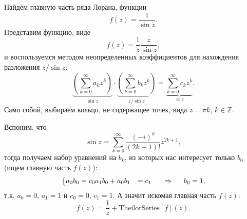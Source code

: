 
Найдём главную часть ряда Лорана, функции
\begin{equation*}
    f(z) = \frac{1}{\sin z}.
\end{equation*}
Представим функцию, виде
\begin{equation*}
    f(z) = \frac{1}{z} \frac{z}{\sin z},
\end{equation*}
и воспользуемся методом неопределенных коэффициентов для нахождения разложения ${z}/{\sin z}$:
\begin{equation*}
    \underbrace{\left(\sum_{k=0}^{\infty} a_k z^k \right)}_{\sin z} \cdot
    \underbrace{\left(\sum_{k=0}^{\infty} b_k z^k\right)}_{z/\sin z} = 
    \underbrace{\sum_{k=0}^{\infty} c_k z^k}_{\equiv z}.
\end{equation*}
Само собой, выбираем кольцо, не содержащее точек, вида $z = \pi k$, $k \in \mathbb{Z}$. 

Вспоним, что
\begin{equation*}
    \sin z = \sum_{k=0}^{\infty}  \frac{(-i)^k}{(2k+1)!} z^{2k + 1},
\end{equation*}
тогда получаем набор уравнений на $b_k$, из которых нас интересует только $b_0$ (ищем главную часть $f(z)$):
\begin{equation*}
    \left\{\begin{aligned}
        a_0 b_0 &= c_0
        a_1 b_0 + a_0 b_1 &= c_1
    \end{aligned}\right.
    \hspace{0.5cm} \Rightarrow \hspace{0.5cm}
    b_0 = 1,
\end{equation*}
т.к. $a_0 = 0$, $a_1 = 1$ и $c_0 = 0$, $c_1 = 1$. А значит искомая главная часть $f(z)$:
\begin{equation*}
    f(z) = \boxed{\frac{1}{z}} + \text{TheilorSeries}[f](z).
\end{equation*}